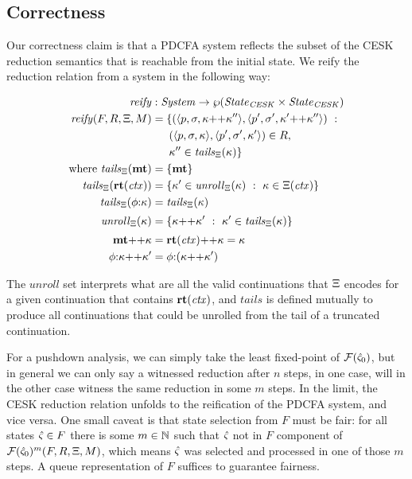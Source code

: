 \subsection{Correctness}

Our correctness claim is that a PDCFA system reflects the subset of the CESK reduction semantics that is reachable from the initial state.
%
We reify the reduction relation from a system in the following way:

\begin{align*}
  \reify &: \mathit{System} \to \wp(\mathit{State}_\mathit{CESK} \times \mathit{State}_\mathit{CESK}) \\
  \reify(F, R, \mktab, \mmemo) &=
  \setbuild{(\tpl{\mpoint,\mstore,\append{\mkont}{\mkont''}},
             \tpl{\mpoint',\mstore',\append{\mkont'}{\mkont''}})}
           {\\ &\phantom{= \{}(\tpl{\mpoint,\mstore,\mkont}, \tpl{\mpoint',\mstore',\mkont'}) \in R,
            \\ &\phantom{= \{}\mkont'' \in \tails{\mktab}{\mkont}} \\
\text{where } \tails{\mktab}{\kmt} &= \set{\kmt} \\
              \tails{\mktab}{\krt{\mctx}} &= \setbuild{\mkont' \in \unroll{\mktab}{\mkont}}{\mkont \in \mktab(\mctx)} \\
              \tails{\mktab}{\kcons{\mkframe}{\mkont}} &= \tails{\mktab}{\mkont}
\\[2pt]
              \unroll{\mktab}{\mkont} &= \setbuild{\append{\mkont}{\mkont'}}{\mkont' \in \tails{\mktab}{\mkont}}
\\[2pt]
              \append{\kmt}{\mkont} &= \append{\krt{\mctx}}{\mkont} = \mkont \\
              \append{\kcons{\mkframe}{\mkont}}{\mkont'} &= \kcons{\mkframe}{(\append{\mkont}{\mkont'})}
\end{align*}

The $\mathit{unroll}$ set interprets what are all the valid continuations that $\Xi$ encodes for a given continuation that contains $\mathbf{rt}(\mathit{ctx})$, and $\mathit{tails}$ is defined mutually to produce all continuations that could be unrolled from the tail of a truncated continuation.

For a pushdown analysis, we can simply take the least fixed-point of ${\mathcal F}(\hat\varsigma_0)$, but in general we can only say a witnessed reduction after $n$ steps, in one case, will in the other case witness the same reduction in some $m$ steps.
%
In the limit, the CESK reduction relation unfolds to the reification of the PDCFA system, and vice versa.
%
One small caveat is that state selection from $F$ must be fair: for all states $\hat\varsigma \in F$ there is some $m \in {\mathbb N}$ such that $\hat\varsigma$ not in $F$ component of ${\mathcal F}(\hat\varsigma_0)^m(F,R,\Xi,M)$, which means $\hat\varsigma$ was selected and processed in one of those $m$ steps.
%
A queue representation of $F$ suffices to guarantee fairness.

